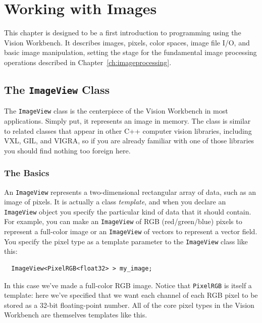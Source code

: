 \chapter{Working with Images}\label{ch:workingwithimages}

This chapter is designed to be a first introduction to programming 
using the Vision Workbench.  It describes images, pixels, color 
spaces, image file I/O, and basic image manipulation, setting the 
stage for the fundamental image processing operations described in 
Chapter~\ref{ch:imageprocessing}.

\section{The {\tt ImageView} Class}

The \verb#ImageView# class is the centerpiece of the Vision Workbench 
in most applications.  Simply put, it represents an image in memory. 
The class is similar to related classes that appear in other C++ computer 
vision libraries, including VXL, GIL, and VIGRA, so if you are already 
familiar with one of those libraries you should find nothing too 
foreign here.

\subsection{The Basics}
An \verb#ImageView# represents a two-dimensional rectangular array of
data, such as an image of pixels.  It is actually a class {\it template}, 
and when you declare an \verb#ImageView# object you specify the
particular kind of data that it should contain.  For example, you can
make an \verb#ImageView# of RGB (red/green/blue) pixels to represent a
full-color image or an \verb#ImageView# of vectors to represent a vector 
field.  You specify the pixel type as a template parameter to the 
\verb#ImageView# class like this:
\begin{verbatim}
  ImageView<PixelRGB<float32> > my_image;
\end{verbatim}
In this case we've made a full-color RGB image.  Notice that 
\verb#PixelRGB# is itself a template: here we've specified that we
want each channel of each RGB pixel to be stored as a 32-bit 
floating-point number.  All of the core pixel types in the Vision 
Workbench are themselves templates like this.

